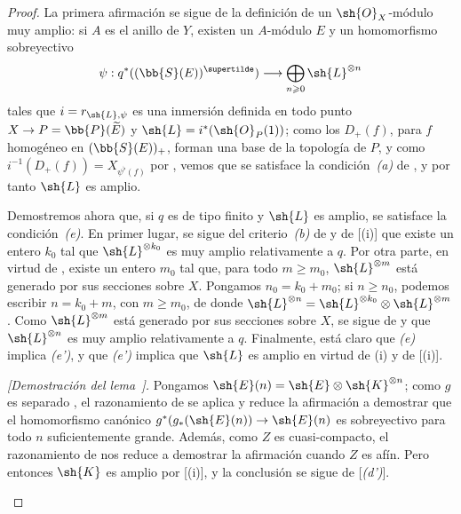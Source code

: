 \documentclass[oneside,10pt]{amsart}
\makeatletter
\renewcommand{\geq}{\geqslant}
\newcommand{\ega@arrow}[2]{\mathchoice{#1}{#2}{#2}{#2}}
\renewcommand{\to}{\ega@arrow{\longrightarrow}{\rightarrow}}
\newcommand{\oldpage}[2][]{\marginnote{\normalfont\footnotesize\textbf{#1}~|~#2}\ignorespaces}
\let\EGAOriginalLabel\label
\renewcommand{\label}[1]{\phantomsection\EGAOriginalLabel{#1}}
\makeatother
\begin{document}
\begin{proof}
La primera afirmación se sigue de la definición  de un $\sh{O}_X$-módulo muy amplio:
si $A$ es el anillo de $Y$, existen un $A$-módulo $E$ y un homomorfismo sobreyectivo
\[
  \psi:q^*((\bb{S}(E))^{\supertilde})\to\bigoplus_{n\geq0}\sh{L}^{\otimes n}
\]
tales que $i=r_{\sh{L},\psi}$ es una inmersión definida en todo punto $X\to P=\bb{P}(\widetilde{E})$ y $\sh{L}=i^*(\sh{O}_P(1))$;
como los $D_+(f)$, para $f$ homogéneo en $(\bb{S}(E))_+$, forman una base de la topología de $P$, y como $i^{-1}(D_+(f))=X_{\psi^\flat(f)}$ por , vemos que se satisface la condición~\emph{(a)} de , y por tanto $\sh{L}$ es amplio.

Demostremos ahora que, si $q$ es de tipo finito y $\sh{L}$ es amplio, se satisface la condición~\emph{(e)}.
En primer lugar, se sigue del criterio~\emph{(b)} de  y de [(i)] que existe
\oldpage[II]{87}
un entero $k_0$ tal que $\sh{L}^{\otimes k_0}$ es muy amplio relativamente a $q$.
Por otra parte, en virtud de , existe un entero $m_0$ tal que, para todo $m\geq m_0$, $\sh{L}^{\otimes m}$ está generado por sus secciones sobre $X$.
Pongamos $n_0=k_0+m_0$;
si $n\geq n_0$, podemos escribir $n=k_0+m$, con $m\geq m_0$, de donde $\sh{L}^{\otimes n}=\sh{L}^{\otimes k_0}\otimes\sh{L}^{\otimes m}$.
Como $\sh{L}^{\otimes m}$ está generado por sus secciones sobre $X$, se sigue de  y  que $\sh{L}^{\otimes n}$ es muy amplio relativamente a $q$.
Finalmente, está claro que \emph{(e)} implica \emph{(e')}, y que \emph{(e')} implica que $\sh{L}$ es amplio en virtud de (i) y de [(i)].

  \begin{env}[4.5.10.1]
  \label{II.4.5.10.1}
  \emph{[Demostración del lema~].}
  Pongamos $\sh{E}(n)=\sh{E}\otimes\sh{K}^{\otimes n}$;
  como $g$ es separado , el razonamiento de  se aplica y reduce la afirmación a demostrar que el homomorfismo canónico $g^*(g_*(\sh{E}(n))\to\sh{E}(n)$ es sobreyectivo para todo $n$ suficientemente grande.
  Además, como $Z$ es cuasi-compacto, el razonamiento de  nos reduce a demostrar la afirmación cuando $Z$ es afín.
  Pero entonces $\sh{K}$ es amplio por [(i)], y la conclusión se sigue de [\emph{(d')}].
  \end{env}
\end{proof}
\end{document}
